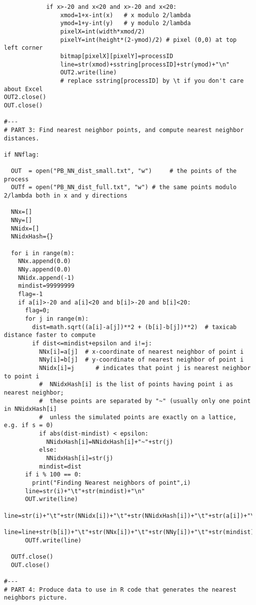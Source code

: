\documentclass[oneside,10pt]{book}
\begin{document}
\begin{lstlisting}
            if x>-20 and x<20 and x>-20 and x<20:
                xmod=1+x-int(x)   # x modulo 2/lambda
                ymod=1+y-int(y)   # y modulo 2/lambda
                pixelX=int(width*xmod/2)   
                pixelY=int(height*(2-ymod)/2) # pixel (0,0) at top left corner
                bitmap[pixelX][pixelY]=processID
                line=str(xmod)+sstring[processID]+str(ymod)+"\n"
                OUT2.write(line)  
                # replace sstring[processID] by \t if you don't care about Excel
OUT2.close()
OUT.close()

#---
# PART 3: Find nearest neighbor points, and compute nearest neighbor distances.

if NNflag:

  OUT  = open("PB_NN_dist_small.txt", "w")     # the points of the process 
  OUTf = open("PB_NN_dist_full.txt", "w") # the same points modulo 2/lambda both in x and y directions

  NNx=[]
  NNy=[]
  NNidx=[]
  NNidxHash={}

  for i in range(m):
    NNx.append(0.0)
    NNy.append(0.0)
    NNidx.append(-1)
    mindist=99999999
    flag=-1
    if a[i]>-20 and a[i]<20 and b[i]>-20 and b[i]<20: 
      flag=0;
      for j in range(m):
        dist=math.sqrt((a[i]-a[j])**2 + (b[i]-b[j])**2)  # taxicab distance faster to compute
        if dist<=mindist+epsilon and i!=j: 
          NNx[i]=a[j]  # x-coordinate of nearest neighbor of point i
          NNy[i]=b[j]  # y-coordinate of nearest neighbor of point i
          NNidx[i]=j      # indicates that point j is nearest neighbor to point i
          #  NNidxHash[i] is the list of points having point i as nearest neighbor;
          #  these points are separated by "~" (usually only one point in NNidxHash[i]
          #  unless the simulated points are exactly on a lattice, e.g. if s = 0)
          if abs(dist-mindist) < epsilon: 
            NNidxHash[i]=NNidxHash[i]+"~"+str(j) 
          else:    
            NNidxHash[i]=str(j) 
          mindist=dist 
      if i % 100 == 0: 
        print("Finding Nearest neighbors of point",i)
      line=str(i)+"\t"+str(mindist)+"\n"
      OUT.write(line) 
      line=str(i)+"\t"+str(NNidx[i])+"\t"+str(NNidxHash[i])+"\t"+str(a[i])+"\t" 
      line=line+str(b[i])+"\t"+str(NNx[i])+"\t"+str(NNy[i])+"\t"+str(mindist)+"\n"
      OUTf.write(line) 

  OUTf.close()
  OUT.close()

#---
# PART 4: Produce data to use in R code that generates the nearest neighbors picture.


\end{lstlisting}
\end{document}
